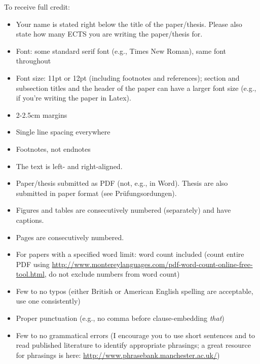 \documentclass[11pt,fleqn,a4paper/thesis]{article}
\newcommand{\6}{\mbox{$[\hspace*{-.6mm}[$}}
\newcommand{\9}{\mbox{$]\hspace*{-.6mm}]$}}
\begin{document}
To receive full credit:

\begin{itemize}[itemsep=-1pt,leftmargin=2.5ex,topsep=-2pt]

\item Your name is stated right below the title of the paper/thesis. Please also state how many ECTS you are writing the paper/thesis for.

\item Font: some standard serif font (e.g., Times New Roman), same font throughout

\item Font size: 11pt or 12pt (including footnotes and references); section and subsection titles and the header of the paper can have a larger font size (e.g., if you're writing the paper in Latex).

\item 2-2.5cm margins 

\item Single line spacing everywhere

\item Footnotes, not endnotes

\item The text is left- and right-aligned.

\item Paper/thesis submitted as PDF (not, e.g., in Word). Thesis are also submitted in paper format (see Pr\"ufungsordungen).

\item Figures and tables are consecutively numbered (separately) and have captions.

\item Pages are consecutively numbered.

\item For papers with a specified word limit: word count included (count entire PDF using \url{http://www.montereylanguages.com/pdf-word-count-online-free-tool.html}, do not exclude numbers from word count)

\item Few to no typos (either British or American English spelling are acceptable, use one consistently)

\item Proper punctuation (e.g., no comma before clause-embedding {\em that})

\item Few to no grammatical errors (I encourage you to use short sentences and to read published literature to identify appropriate phrasings; a great resource for phrasings is here: \url{http://www.phrasebank.manchester.ac.uk/})


\end{itemize}
\end{document}
